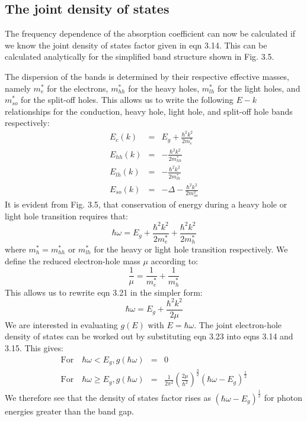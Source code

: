 \documentclass[12pt]{book}
\begin{document}
\subsection{The joint density of states}

The frequency dependence of the absorption coefficient can now be calculated if we know the joint density of states factor given in eqn 3.14. This can be calculated analytically for the simplified band structure shown in Fig. 3.5.

The dispersion of the bands is determined by their respective effective masses, namely $m_e^*$ for the electrons, $m_{hh}^*$ for the heavy holes, $m_{lh}^*$ for the light holes, and $m_{so}^*$ for the split-off holes. This allows us to write the following $E-k$ relationships for the conduction, heavy hole, light hole, and split-off hole bands respectively:
\begin{eqnarray}
  E_c(k) &=& E_g+\frac{\hbar^2k^2}{2m_e^*} \\
  E_{hh}(k) &=& -\frac{\hbar^2k^2}{2m_{hh}^*} \\
  E_{lh}(k) &=& -\frac{\hbar^2k^2}{2m_{lh}^*} \\
  E_{so}(k) &=& -\Delta-\frac{\hbar^2k^2}{2m_{so}^2}
\end{eqnarray}
It is evident from Fig. 3.5, that conservation of energy during a heavy hole or light hole transition requires that:
\begin{equation}\label{equa:3.21}
  \hbar\omega=E_g+\frac{\hbar^2k^2}{2m_e^*}+\frac{\hbar^2k^2}{2m_h^*}
\end{equation}
where $m_h^* = m_{hh}^*$ or $m_{lh}^*$ for the heavy or light hole transition respectively. We define the reduced electron-hole mass $\mu$ according to:
\begin{equation}\label{equa:3.22}
  \frac{1}{\mu}=\frac{1}{m_e^*}+\frac{1}{m_h^*}
\end{equation}
This allows us to rewrite eqn 3.21 in the simpler form:
\begin{equation}\label{equa:3.23}
  \hbar\omega=E_g+\frac{\hbar^2k^2}{2\mu}
\end{equation}
We are interested in evaluating $g(E)$ with $E = \hbar\omega$. The joint electron-hole density of states can be worked out by substituting eqn 3.23 into eqns 3.14 and 3.15. This gives:
\begin{eqnarray}
  \text{For}\quad\hbar\omega<E_g,g(\hbar\omega) &=& 0 \\
  \text{For}\quad\hbar\omega\ge E_g,g(\hbar\omega)&=&\frac{1}{2\pi^2}(\frac{2\mu}{\hbar^2})^{\frac{3}{2}}(\hbar\omega-E_g)^{\frac{1}{2}}
\end{eqnarray}
We therefore see that the density of states factor rises as $(\hbar\omega-E_g)^{\frac{1}{2}}$ for photon energies greater than the band gap.
\end{document}
